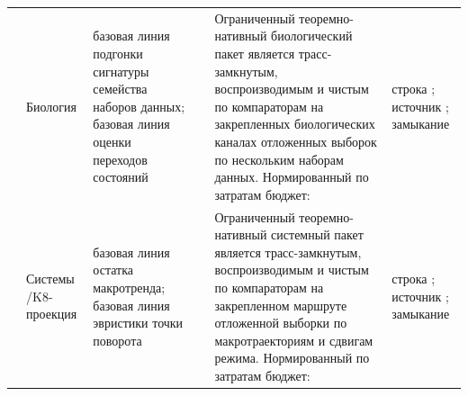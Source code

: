\begin{longtable}{@{}L{0.14\textwidth}L{0.10\textwidth}L{0.17\textwidth}L{0.10\textwidth}L{0.23\textwidth}L{0.18\textwidth}@{}}
 & Биология & базовая линия подгонки сигнатуры семейства наборов данных; базовая линия оценки переходов состояний &  & Ограниченный теоремно-нативный биологический пакет является трасс-замкнутым, воспроизводимым и чистым по компараторам на закрепленных биологических каналах отложенных выборок по нескольким наборам данных. \allowbreak Нормированный по затратам бюджет:  & строка ; \allowbreak источник ; \allowbreak замыкание  \\
 & Системы /\allowbreak K8-проекция & базовая линия остатка макротренда; базовая линия эвристики точки поворота &  & Ограниченный теоремно-нативный системный пакет является трасс-замкнутым, воспроизводимым и чистым по компараторам на закрепленном маршруте отложенной выборки по макротраекториям и сдвигам режима. \allowbreak Нормированный по затратам бюджет:  & строка ; \allowbreak источник ; \allowbreak замыкание  \\
\bottomrule
\end{longtable}
\endgroup

